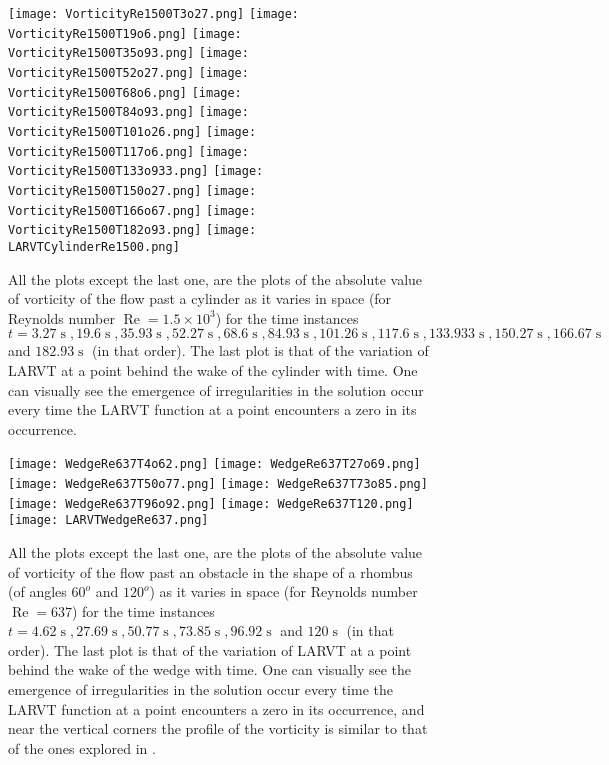 \documentclass{article}
\begin{document}
\begin{figure}
\texttt{[image: VorticityRe1500T3o27.png]}
\texttt{[image: VorticityRe1500T19o6.png]}
\texttt{[image: VorticityRe1500T35o93.png]}
\texttt{[image: VorticityRe1500T52o27.png]}
\texttt{[image: VorticityRe1500T68o6.png]}
\texttt{[image: VorticityRe1500T84o93.png]}
\texttt{[image: VorticityRe1500T101o26.png]}
\texttt{[image: VorticityRe1500T117o6.png]}
\texttt{[image: VorticityRe1500T133o933.png]}
\texttt{[image: VorticityRe1500T150o27.png]}
\texttt{[image: VorticityRe1500T166o67.png]}
\texttt{[image: VorticityRe1500T182o93.png]}
\texttt{[image: LARVTCylinderRe1500.png]}
\caption{\label{Fig1} All the plots except the last one, are the plots of the absolute value of vorticity of the flow past a cylinder as it varies in space (for Reynolds number $\operatorname{Re} = 1.5 \times 10^3$) for the time instances $t = 3.27 \operatorname{s}, 19.6 \operatorname{s}, 35.93 \operatorname{s}, 52.27 \operatorname{s}, 68.6 \operatorname{s}, 84.93 \operatorname{s}, 101.26 \operatorname{s}, 117.6 \operatorname{s}, 133.933 \operatorname{s}, 150.27 \operatorname{s}, 166.67 \operatorname{s}$ and $182.93 \operatorname{s}$ (in that order). The last plot is that of the variation of LARVT at a point behind the wake of the cylinder with time. One can visually see the emergence of irregularities in the solution occur every time the LARVT function at a point encounters a zero in its occurrence.}
\end{figure}
\begin{figure}
\texttt{[image: WedgeRe637T4o62.png]}
\texttt{[image: WedgeRe637T27o69.png]}
\texttt{[image: WedgeRe637T50o77.png]}
\texttt{[image: WedgeRe637T73o85.png]}
\texttt{[image: WedgeRe637T96o92.png]}
\texttt{[image: WedgeRe637T120.png]}
\texttt{[image: LARVTWedgeRe637.png]}
\caption{\label{Fig2} All the plots except the last one, are the plots of the absolute value of vorticity of the flow past an obstacle in the shape of a rhombus (of angles $60^{o}$ and $120^{o}$) as it varies in space (for Reynolds number $\operatorname{Re} = 637$) for the time instances $t = 4.62 \operatorname{s}, 27.69 \operatorname{s}, 50.77 \operatorname{s}, 73.85 \operatorname{s}, 96.92 \operatorname{s}$ and $120 \operatorname{s}$ (in that order). The last plot is that of the variation of LARVT at a point behind the wake of the wedge with time. One can visually see the emergence of irregularities in the solution occur every time the LARVT function at a point encounters a zero in its occurrence, and near the vertical corners the profile of the vorticity is similar to that of the ones explored in \cite{lingxu}.}
\end{figure}
\end{document}
